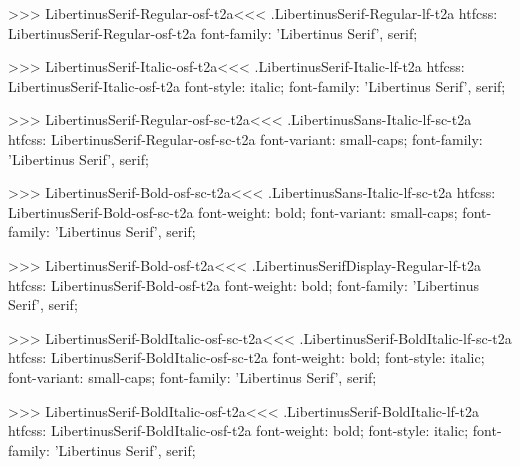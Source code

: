 {{{{{>>>
\<LibertinusSerif-Regular-osf-t2a\><<<
.LibertinusSerif-Regular-lf-t2a
htfcss:  LibertinusSerif-Regular-osf-t2a  font-family: 'Libertinus Serif', serif;

>>>
\<LibertinusSerif-Italic-osf-t2a\><<<
.LibertinusSerif-Italic-lf-t2a
htfcss:  LibertinusSerif-Italic-osf-t2a  font-style: italic; font-family: 'Libertinus Serif', serif;

>>>
\<LibertinusSerif-Regular-osf-sc-t2a\><<<
.LibertinusSans-Italic-lf-sc-t2a
htfcss:  LibertinusSerif-Regular-osf-sc-t2a  font-variant: small-caps; font-family: 'Libertinus Serif', serif;

>>>
\<LibertinusSerif-Bold-osf-sc-t2a\><<<
.LibertinusSans-Italic-lf-sc-t2a
htfcss:  LibertinusSerif-Bold-osf-sc-t2a  font-weight: bold; font-variant: small-caps; font-family: 'Libertinus Serif', serif;

>>>
\<LibertinusSerif-Bold-osf-t2a\><<<
.LibertinusSerifDisplay-Regular-lf-t2a
htfcss:  LibertinusSerif-Bold-osf-t2a  font-weight: bold; font-family: 'Libertinus Serif', serif;

>>>
\<LibertinusSerif-BoldItalic-osf-sc-t2a\><<<
.LibertinusSerif-BoldItalic-lf-sc-t2a
htfcss:  LibertinusSerif-BoldItalic-osf-sc-t2a  font-weight: bold; font-style: italic; font-variant: small-caps; font-family: 'Libertinus Serif', serif;

>>>
\<LibertinusSerif-BoldItalic-osf-t2a\><<<
.LibertinusSerif-BoldItalic-lf-t2a
htfcss:  LibertinusSerif-BoldItalic-osf-t2a  font-weight: bold; font-style: italic; font-family: 'Libertinus Serif', serif;

}}}}}
